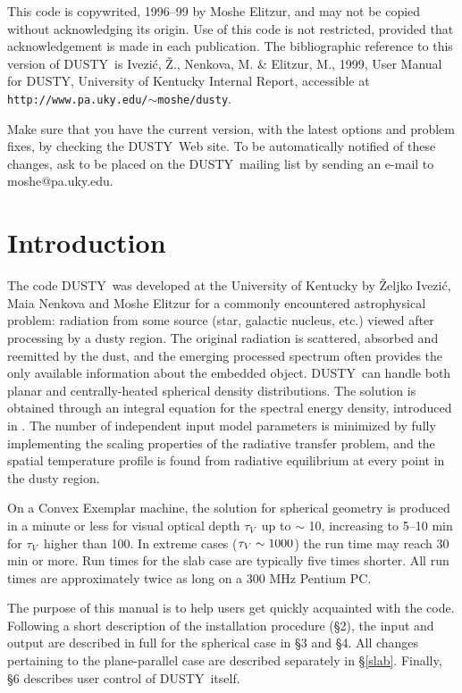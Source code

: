 \documentclass[12pt]{article} \usepackage{epsf}
\def\Section#1{\section{\sc #1}}
\def\D  {{\sf DUSTY}}
\def\tV     {\hbox{$\tau_V$}}
\def\Ivezic {Ivezi\'c}
\def\tthdump#1{#1}      %
\begin{document}
This code is copywrited, 1996--99 by Moshe Elitzur, and may not be copied
without acknowledging its origin. Use of this code is not restricted, provided
that acknowledgement is made in each publication.  The bibliographic reference
to this version of \D\ is \Ivezic, \v Z., Nenkova, M. \& Elitzur, M., 1999,
User Manual for \D, University of Kentucky Internal Report, accessible at {\tt
http://www.pa.uky.edu/$\sim$moshe/dusty}.

\tthdump{\bigskip}

Make sure that you have the current version, with the latest options and
problem fixes, by checking the \D\ Web site. To be automatically notified of
these changes, ask to be placed on the \D\ mailing list by sending an e-mail to
moshe@pa.uky.edu.

\newpage

\tableofcontents \vskip 0.5in

\Section{Introduction} \label{Introduction}

The code \D\ was developed at the University of Kentucky by \v Zeljko \Ivezic,
Maia Nenkova and Moshe Elitzur for a commonly encountered astrophysical
problem: radiation from some source (star, galactic nucleus, etc.) viewed after
processing by a dusty region. The original radiation is scattered, absorbed and
reemitted by the dust, and the emerging processed spectrum often provides the
only available information about the embedded object. \D\ can handle both
planar and centrally-heated spherical density distributions.  The solution is
obtained through an integral equation for the spectral energy density,
introduced in \cite{IE97}. The number of independent input model parameters is
minimized by fully implementing the scaling properties of the radiative
transfer problem, and the spatial temperature profile is found from radiative
equilibrium at every point in the dusty region.

On a Convex Exemplar machine, the solution for spherical geometry is produced
in a minute or less for visual optical depth \tV\ up to $\sim$ 10, increasing
to 5--10 min for \tV\ higher than 100. In extreme cases ($\tV \sim 1000$) the
run time may reach 30 min or more. Run times for the slab case are typically
five times shorter. All run times are approximately twice as long on a 300 MHz
Pentium PC.

The purpose of this manual is to help users get quickly acquainted with the
code. Following a short description of the installation procedure (\S2), the
input and output are described in full for the spherical case in \S3 and \S4.
All changes pertaining to the plane-parallel case are described separately in
\S\ref{slab}.  Finally, \S6 describes user control of \D\ itself.
\end{document}
